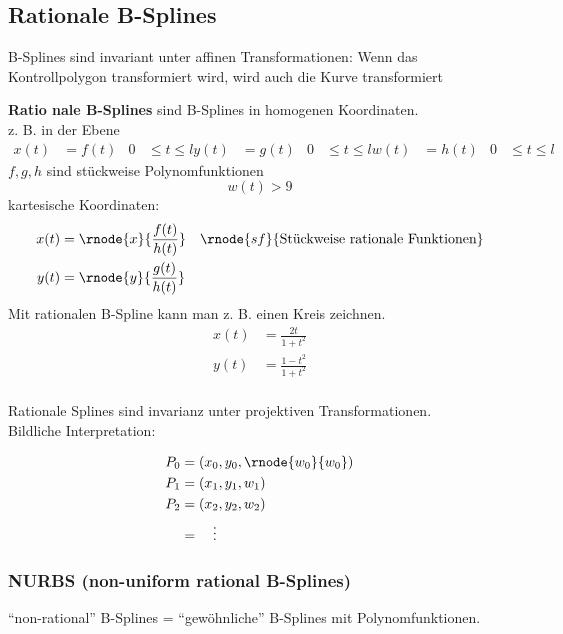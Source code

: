 \subsection{Rationale B-Splines}
\Satz B-Splines sind invariant unter affinen Transformationen: Wenn das Kontrollpolygon transformiert wird, wird auch
	die Kurve transformiert
\begin{center}
\end{center}
\Defi \textbf{Ratio nale B-Splines} sind B-Splines in homogenen Koordinaten.\\[1em]
z. B. in der Ebene
\begin{align*}
 x(t) &= f(t)	& 0 &\le t \le l
 y(t) &= g(t)	& 0 &\le t \le l
 w(t) &= h(t)	& 0 &\le t \le l
\end{align*}
$f, g, h$ sind stückweise Polynomfunktionen
\[w(t)> 9\]
kartesische Koordinaten:
\begin{align*}
 x(t) &= \rnode{x}{\frac{f(t)}{h(t)}} & \rnode{sf}{\text{Stückweise rationale Funktionen}}\\
 y(t) &= \rnode{y}{\frac{g(t)}{h(t)}}
\end{align*}
Mit rationalen B-Spline kann man z. B. einen Kreis zeichnen.
\begin{align*}
 x(t) &= \frac{2t}{1+t^2}\\
 y(t) &= \frac{1-t^2}{1+t^2}\\
\end{align*}
\begin{center}
\end{center}
\Satz Rationale Splines sind invarianz unter projektiven Transformationen.\\[1em]
Bildliche Interpretation:
\begin{center}
\end{center}
\hspace{8cm}
\begin{align*}
 P_0 &= \left(x_0, y_0, \rnode{w_0}{w_0}\right)\\
 P_1 &= \left(x_1, y_1, w_1\right)\\
 P_2 &= \left(x_2, y_2, w_2\right)\\
	&= \quad \vdots
\end{align*}

\subsubsection[NURBS]{NURBS (non-uniform rational B-Splines)}
"`non-rational"' B-Splines = "`gewöhnliche"' B-Splines mit Polynomfunktionen.